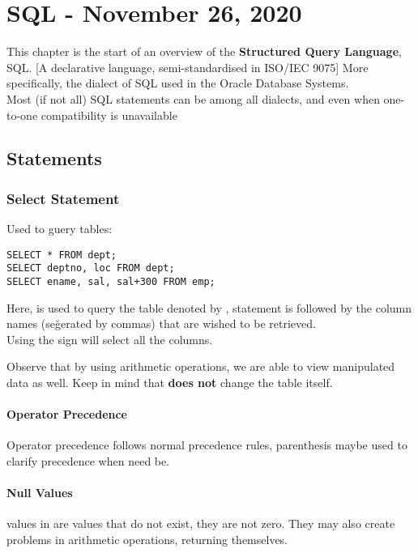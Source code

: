 \documentclass[11pt,a4paper,twocolumn]{book}
\begin{document}
\chapter{SQL - November 26, 2020}

This chapter is the start of an overview of the \textbf{Structured Query Language}, SQL. [A declarative language, semi-standardised in ISO/IEC 9075] More specifically, the dialect of SQL used in the Oracle Database Systems.\\

Most (if not all) SQL statements can be among all dialects, and even when one-to-one compatibility is unavailable

\section{Statements}
\subsection{Select Statement}
Used to guery tables:
\begin{lstlisting}
SELECT * FROM dept;
SELECT deptno, loc FROM dept;
SELECT ename, sal, sal+300 FROM emp;
\end{lstlisting}

Here,  is used to query the table denoted by ,  statement is followed by the column names (seğerated by commas) that are wished to be retrieved.\\

Using the \C{*} sign will select all the columns.

Observe that by using arithmetic operations, we are able to view manipulated data as well. Keep in mind that  \textbf{does not} change the table itself.

\subsubsection{Operator Precedence}

Operator precedence follows normal precedence rules, parenthesis maybe used to clarify precedence when need be.

\subsubsection{Null Values}

 values in are values that do not exist, they are not zero. They may also create problems in arithmetic operations, returning  themselves.
\end{document}
